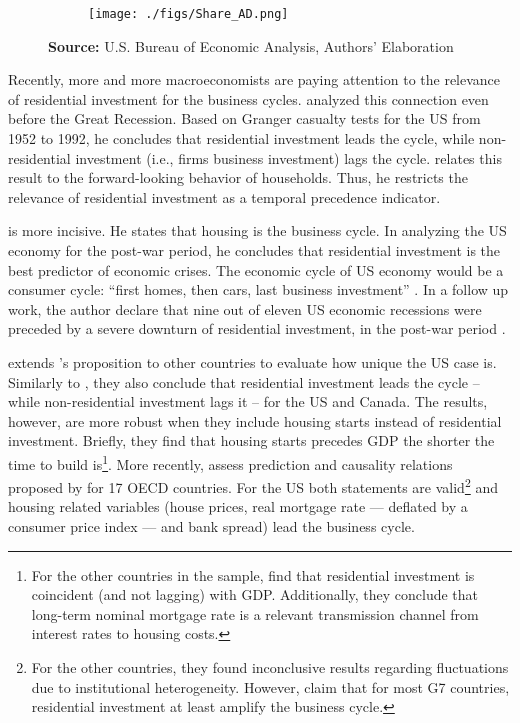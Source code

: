 \documentclass[12pt, a4paper]{article}
\begin{document}
\begin{figure}[H]
    \centering
	\caption{Expenditures share on GDP}
	\label{fig:share}
\begin{figure}[htb]
    \texttt{[image: ./figs/Share\_AD.png]}
    \end{figure}
	\caption*{\textbf{Source:} U.S. Bureau of Economic Analysis, Authors' Elaboration}
\end{figure}

Recently, more and more macroeconomists are paying attention to the relevance of residential investment for the business cycles.
\textcite{green_follow_1997} analyzed this connection even before the Great Recession.
Based on Granger casualty tests for the US from 1952 to 1992, he concludes that residential investment leads the cycle, while non-residential investment (i.e., firms business investment) lags the cycle.
\textcite{green_follow_1997} relates this result to the forward-looking behavior of households.
Thus, he restricts the relevance of residential investment as a temporal precedence indicator.

\textcite{leamer_housing_2007} is more incisive. He states that housing is the business cycle.
In analyzing the US economy for the post-war period, he concludes that residential investment is the best predictor of economic crises.
The economic cycle of US economy would be a consumer cycle: ``first homes, then cars, last business investment'' \cite[p.~8]{leamer_housing_2007}.
In a follow up work, the author declare that nine out of eleven US economic recessions were preceded by a severe downturn of residential investment, in the post-war period \cite{leamer_housing_2015}.

\textcite{kydland_2016_housing} extends \citeauthor*{leamer_housing_2007}'s \citeyear{leamer_housing_2007} proposition to other countries to evaluate how unique the US case is.
Similarly to \textcite{green_follow_1997}, they also conclude that residential investment leads the cycle -- while non-residential investment lags it -- for the US and Canada.
The results, however, are more robust when they include housing starts instead of residential investment.
Briefly, they find that housing starts precedes GDP the shorter the time to build is\footnote{For the other countries in the sample, \textcite{kydland_2016_housing} find that residential investment is coincident (and not lagging) with GDP. Additionally, they conclude that long-term nominal mortgage rate is a relevant transmission channel from interest rates to housing costs.}.
More recently, \textcite{huang_is_2018} assess  prediction and causality relations proposed by \textcite{leamer_housing_2007} for 17 OECD countries.
For the US both statements are valid\footnote{For the other countries, they found inconclusive results regarding fluctuations due to institutional heterogeneity. However, \textcite{huang_is_2018} claim that for most G7 countries, residential investment at least amplify the business cycle.} and housing related variables (house prices, real mortgage rate --- deflated by a consumer price index --- and bank spread) lead the business cycle.
\end{document}
